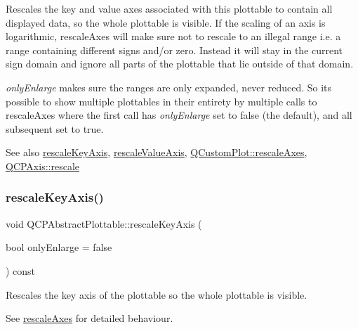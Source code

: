 Rescales the key and value axes associated with this plottable to contain all displayed data, so the whole plottable is visible. If the scaling of an axis is logarithmic, rescale\+Axes will make sure not to rescale to an illegal range i.\+e. a range containing different signs and/or zero. Instead it will stay in the current sign domain and ignore all parts of the plottable that lie outside of that domain.

{\itshape only\+Enlarge} makes sure the ranges are only expanded, never reduced. So it\textquotesingle{}s possible to show multiple plottables in their entirety by multiple calls to rescale\+Axes where the first call has {\itshape only\+Enlarge} set to false (the default), and all subsequent set to true.

\begin{DoxySeeAlso}{See also}
\hyperlink{class_q_c_p_abstract_plottable_ae96b83c961e257da116c6acf9c7da308}{rescale\+Key\+Axis}, \hyperlink{class_q_c_p_abstract_plottable_aa1e408bb2d13999150c3f7f8a8579ca9}{rescale\+Value\+Axis}, \hyperlink{class_q_custom_plot_ad86528f2cee6c7e446dea4a6e8839935}{Q\+Custom\+Plot\+::rescale\+Axes}, \hyperlink{class_q_c_p_axis_a499345f02ebce4b23d8ccec96e58daa9}{Q\+C\+P\+Axis\+::rescale} 
\end{DoxySeeAlso}
\hypertarget{class_q_c_p_abstract_plottable_ae96b83c961e257da116c6acf9c7da308}{}\label{class_q_c_p_abstract_plottable_ae96b83c961e257da116c6acf9c7da308} 
\subsubsection{\texorpdfstring{rescale\+Key\+Axis()}{rescaleKeyAxis()}}
{\footnotesize\ttfamily void Q\+C\+P\+Abstract\+Plottable\+::rescale\+Key\+Axis (\begin{DoxyParamCaption}\item[{bool}]{only\+Enlarge = {\ttfamily false} }\end{DoxyParamCaption}) const}

Rescales the key axis of the plottable so the whole plottable is visible.

See \hyperlink{class_q_c_p_abstract_plottable_a1491c4a606bccd2d09e65e11b79eb882}{rescale\+Axes} for detailed behaviour. \hypertarget{class_q_c_p_abstract_plottable_aa1e408bb2d13999150c3f7f8a8579ca9}{}\label{class_q_c_p_abstract_plottable_aa1e408bb2d13999150c3f7f8a8579ca9} 
